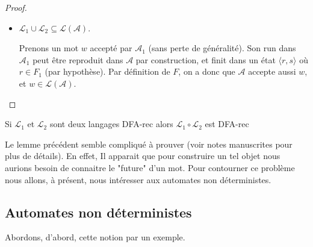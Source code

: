 \begin{proof}
\begin{itemize}
    \item $\mathcal{L}_1 \cup \mathcal{L}_2 \subseteq \mathcal{L}(\mathcal{A})$.

    Prenons un mot $w$ accepté par $\mathcal{A}_1$ (sans perte de généralité).
    Son run dans $\mathcal{A}_1$ peut être reproduit dans $\mathcal{A}$ par
    construction, et finit dans un état $\langle r, s \rangle$ où $r \in F_1$
    (par hypothèse). Par définition de $F$, on a donc que $\mathcal{A}$ accepte
    aussi $w$, et $w \in \mathcal{L}(\mathcal{A})$.
    \end{itemize}

\end{proof}


\begin{lemme}
    Si $\mathcal{L}_1$ et $\mathcal{L}_2$ sont deux langages DFA-rec alors $\mathcal{L}_1\circ \mathcal{L}_2$ est DFA-rec
\end{lemme}

Le lemme précédent semble compliqué à prouver (voir notes manuscrites pour plus de détails).
En effet, Il apparait que pour construire un tel objet nous aurions besoin de connaitre le "future" d'un mot.
Pour contourner ce problème nous allons, à présent, nous intéresser aux automates non déterministes.





\subsection{Automates non déterministes}
Abordons, d'abord, cette notion par un exemple.

